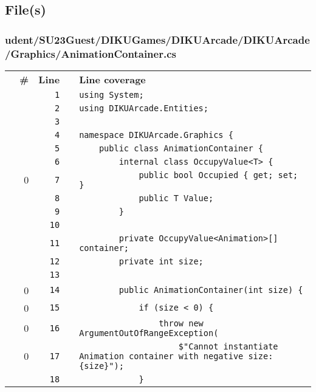 \documentclass[a4paper,landscape,10pt]{article}
\begin{document}
\subsection{File(s)}
\subsubsection{udent/SU23Guest/DIKUGames/DIKUArcade/DIKUArcade/Graphics/AnimationContainer.cs}
\begin{longtable}[l]{lrrll}
\textbf{} & \textbf{\#} & \textbf{Line} & \textbf{} & \textbf{Line coverage}\\
\cellcolor{gray} &  & \verb~1~ & & \verb~using System;~\\
\cellcolor{gray} &  & \verb~2~ & & \verb~using DIKUArcade.Entities;~\\
\cellcolor{gray} &  & \verb~3~ & & \verb~~\\
\cellcolor{gray} &  & \verb~4~ & & \verb~namespace DIKUArcade.Graphics {~\\
\cellcolor{gray} &  & \verb~5~ & & \verb~    public class AnimationContainer {~\\
\cellcolor{gray} &  & \verb~6~ & & \verb~        internal class OccupyValue<T> {~\\
\cellcolor{red} & 0 & \verb~7~ & & \verb~            public bool Occupied { get; set; }~\\
\cellcolor{gray} &  & \verb~8~ & & \verb~            public T Value;~\\
\cellcolor{gray} &  & \verb~9~ & & \verb~        }~\\
\cellcolor{gray} &  & \verb~10~ & & \verb~~\\
\cellcolor{gray} &  & \verb~11~ & & \verb~        private OccupyValue<Animation>[] container;~\\
\cellcolor{gray} &  & \verb~12~ & & \verb~        private int size;~\\
\cellcolor{gray} &  & \verb~13~ & & \verb~~\\
\cellcolor{red} & 0 & \verb~14~ & & \verb~        public AnimationContainer(int size) {~\\
\cellcolor{red} & 0 & \verb~15~ & & \verb~            if (size < 0) {~\\
\cellcolor{red} & 0 & \verb~16~ & & \verb~                throw new ArgumentOutOfRangeException(~\\
\cellcolor{red} & 0 & \verb~17~ & & \verb~                    $"Cannot instantiate Animation container with negative size: {size}");~\\
\cellcolor{gray} &  & \verb~18~ & & \verb~            }~\\

\end{longtable}
\end{document}
